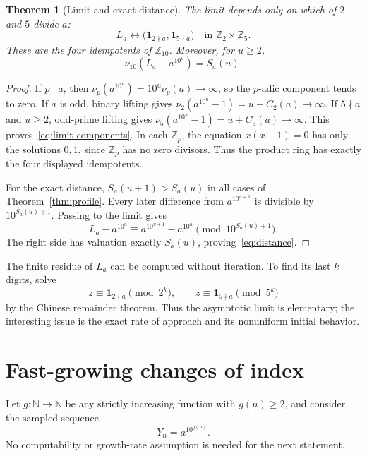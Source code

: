 \documentclass[11pt,a4paper]{article}
\newtheorem{theorem}{Theorem}[section]
\theoremstyle{definition}
\newcommand{\Z}{\mathbb Z}
\newcommand{\N}{\mathbb N}
\begin{document}
\begin{theorem}[Limit and exact distance]\label{thm:idempotents}
The limit depends only on which of $2$ and $5$ divide $a$:
\begin{equation}\label{eq:limit-components}
L_a\longleftrightarrow
\bigl(\mathbf1_{2\nmid a},\mathbf1_{5\nmid a}\bigr)
\quad\text{in }\Z_2\times\Z_5.
\end{equation}
These are the four idempotents of $\Z_{10}$. Moreover, for $u\ge2$,
\begin{equation}\label{eq:distance}
\nu_{10}(L_a-a^{10^u})=S_a(u).
\end{equation}
\end{theorem}
\begin{proof}
If $p\mid a$, then $\nu_p(a^{10^u})=10^u\nu_p(a)\to\infty$, so the
$p$-adic component tends to zero. If $a$ is odd, binary lifting gives
$\nu_2(a^{10^u}-1)=u+C_2(a)\to\infty$.
If $5\nmid a$ and $u\ge2$, odd-prime lifting gives
$\nu_5(a^{10^u}-1)=u+C_5(a)\to\infty$.
This proves~\eqref{eq:limit-components}. In each $\Z_p$, the equation
$x(x-1)=0$ has only the solutions $0,1$, since $\Z_p$ has no zero divisors.
Thus the product ring has exactly the four displayed idempotents.

For the exact distance, $S_a(u+1)>S_a(u)$ in all cases of
Theorem~\ref{thm:profile}. Every later difference from $a^{10^{u+1}}$
is divisible by $10^{S_a(u)+1}$. Passing to the limit gives
\[
L_a-a^{10^u}\equiv a^{10^{u+1}}-a^{10^u}\pmod{10^{S_a(u)+1}}.
\]
The right side has valuation exactly $S_a(u)$, proving~\eqref{eq:distance}.
\end{proof}

The finite residue of $L_a$ can be computed without iteration. To find its
last $k$ digits, solve
\[
z\equiv\mathbf1_{2\nmid a}\pmod{2^k},\qquad
z\equiv\mathbf1_{5\nmid a}\pmod{5^k}
\]
by the Chinese remainder theorem. Thus the asymptotic limit is elementary;
the interesting issue is the exact rate of approach and its nonuniform
initial behavior.

\section{Fast-growing changes of index}\label{sec:time}

Let $g:\N\to\N$ be any strictly increasing function with $g(n)\ge2$, and
consider the sampled sequence
\[
Y_n=a^{10^{g(n)}}.
\]
No computability or growth-rate assumption is needed for the next statement.
\end{document}
